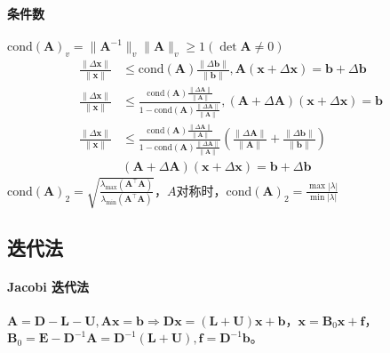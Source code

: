 \documentclass[twocolumn]{ctexart}
\begin{document}
\paragraph{条件数}$\text{cond}(\mathbf{A})_v=\lVert\mathbf{A}^{-1}\rVert_v\lVert\mathbf{A}\rVert_v\geq 1(\det\mathbf{A}\neq 0)$
\begin{align*}
    \frac{\lVert\Delta\mathbf{x}\rVert}{\lVert\mathbf{x}\rVert}&\leq\text{cond}(\mathbf{A})\frac{\lVert\Delta\mathbf{b}\rVert}{\lVert\mathbf{b}\rVert},\mathbf{A}(\mathbf{x}+\Delta\mathbf{x})=\mathbf{b}+\Delta\mathbf{b}\\
    \frac{\lVert\Delta\mathbf{x}\rVert}{\lVert\mathbf{x}\rVert}&\leq\frac{\text{cond}(\mathbf{A})\frac{\lVert\Delta\mathbf{A}\rVert}{\lVert\mathbf{A}\rVert}}{1-\text{cond}(\mathbf{A})\frac{\lVert\Delta\mathbf{A}\rVert}{\lVert\mathbf{A}\rVert}},(\mathbf{A}+\Delta\mathbf{A})(\mathbf{x}+\Delta\mathbf{x})=\mathbf{b}\\
    \frac{\lVert\Delta\mathbf{x}\rVert}{\lVert\mathbf{x}\rVert}&\leq\frac{\text{cond}(\mathbf{A})\frac{\lVert\Delta\mathbf{A}\rVert}{\lVert\mathbf{A}\rVert}}{1-\text{cond}(\mathbf{A})\frac{\lVert\Delta\mathbf{A}\rVert}{\lVert\mathbf{A}\rVert}}\left(\frac{\lVert\Delta\mathbf{A}\rVert}{\lVert\mathbf{A}\rVert}+\frac{\lVert\Delta\mathbf{b}\rVert}{\lVert\mathbf{b}\rVert}\right)\\&(\mathbf{A}+\Delta\mathbf{A})(\mathbf{x}+\Delta\mathbf{x})=\mathbf{b}+\Delta\mathbf{b}
\end{align*}
$\text{cond}(\mathbf{A})_2=\sqrt{\frac{\lambda_{\text{max}}(\mathbf{A}^\top\mathbf{A})}{\lambda_{\text{min}}(\mathbf{A}^\top\mathbf{A})}}$，$A$对称时，$\text{cond}(\mathbf{A})_2=\frac{\max|\lambda|}{\min|\lambda|}$


\subsection{迭代法}

\paragraph{Jacobi 迭代法} $\mathbf{A}=\mathbf{D}-\mathbf{L}-\mathbf{U},\mathbf{A}\mathbf{x}=\mathbf{b}\Rightarrow \mathbf{D}\mathbf{x}=(\mathbf{L}+\mathbf{U})\mathbf{x}+\mathbf{b}$，$\mathbf{x}=\mathbf{B}_0\mathbf{x}+\mathbf{f}$，$\mathbf{B}_0=\mathbf{E}-\mathbf{D}^{-1}\mathbf{A}=\mathbf{D}^{-1}(\mathbf{L}+\mathbf{U}),\mathbf{f}=\mathbf{D}^{-1}\mathbf{b}$。
\end{document}
